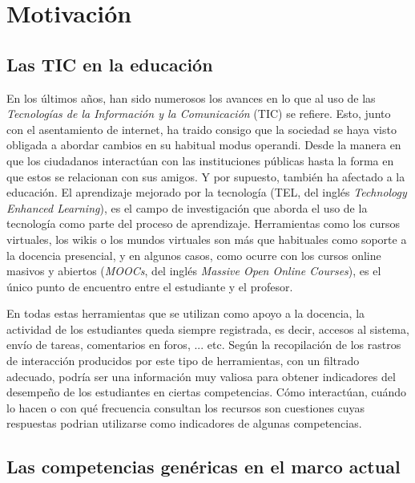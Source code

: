 


\section{Motivación}
\label{sec:Motivation}

\subsection*{Las TIC en la educación}

En los últimos años, han sido numerosos los avances en lo que al uso de las \emph{Tecnologías de la Información y la Comunicación} (TIC) se refiere. Esto, junto con el asentamiento de internet, ha traido consigo que la sociedad se haya visto obligada a abordar cambios en su habitual modus operandi. Desde la manera en que los ciudadanos interactúan con las instituciones públicas hasta la forma en que estos se relacionan con sus amigos. Y por supuesto, también ha afectado a la educación. El aprendizaje mejorado por la tecnología (TEL, del inglés \emph{Technology Enhanced Learning}), es el campo de investigación que aborda el uso de la tecnología como parte del proceso de aprendizaje. Herramientas como los cursos virtuales, los wikis o los mundos virtuales son más que habituales como soporte a la docencia presencial, y en algunos casos, como ocurre con los cursos online masivos y abiertos (\emph{MOOCs}, del inglés \emph{Massive Open Online Courses}), es el único punto de encuentro entre el estudiante y el profesor.

En todas estas herramientas que se utilizan como apoyo a la docencia, la actividad de los estudiantes queda siempre registrada, es decir, accesos al sistema, envío de tareas, comentarios en foros, ... etc. Según \cite{Chebil:2012, Florian:2011} la recopilación de los rastros de interacción producidos por este tipo de herramientas, con un filtrado adecuado, podría ser una información muy valiosa para obtener indicadores del desempeño de los estudiantes en ciertas competencias. Cómo interactúan, cuándo lo hacen o con qué frecuencia consultan los recursos son cuestiones cuyas respuestas podrian utilizarse como indicadores de algunas competencias.

\subsection*{Las competencias genéricas en el marco actual}

